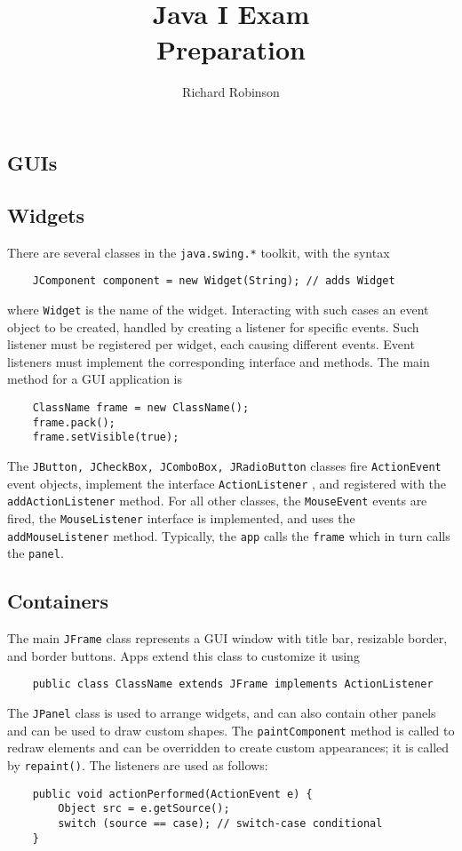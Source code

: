\documentclass[letterpaper, openany, justified]{tufte-book}
\title{\\Java I Exam \\Preparation}
\author{Richard Robinson}
\newcommand{\cd}[1]{\lstinline{#1}}
\begin{document}
\maketitle
\tableofcontents
\setlength{\parindent}{0pt}
\begin{fullwidth}

\chapter{GUIs}

\section{Widgets}
There are several classes in the \lstinline{java.swing.*} toolkit, with the syntax \begin{lstlisting}
    JComponent component = new Widget(String); // adds Widget
\end{lstlisting}
where \lstinline{Widget} is the name of the widget. Interacting with such cases an event object to be created, handled by creating a listener for specific events. Such listener must be registered per widget, each causing different events. Event listeners must implement the corresponding interface and methods. The main method for a GUI application is
\begin{lstlisting}
    ClassName frame = new ClassName();
    frame.pack();
    frame.setVisible(true);
\end{lstlisting}
The \lstinline{JButton, JCheckBox, JComboBox, JRadioButton} classes fire \lstinline{ActionEvent} event objects, implement the interface \lstinline{ActionListener} , and registered with the \lstinline{addActionListener} method. For all other classes, the \lstinline{MouseEvent} events are fired, the \lstinline{MouseListener} interface is implemented, and uses the \lstinline{addMouseListener} method. Typically, the \lstinline{app} calls the \cd{frame} which in turn calls the \cd{panel}.

\section{Containers}
The main \lstinline{JFrame} class represents a GUI window with title bar, resizable border, and border buttons. Apps extend this class to customize  it using \begin{lstlisting}
    public class ClassName extends JFrame implements ActionListener
\end{lstlisting}
The \cd{JPanel} class is used to arrange widgets, and can also contain other panels and can be used to draw custom shapes. The \cd{paintComponent} method is called to redraw elements and can be overridden to create custom appearances; it is called by \cd{repaint()}. The listeners are used as follows:
\begin{lstlisting}
    public void actionPerformed(ActionEvent e) {
        Object src = e.getSource();
        switch (source == case); // switch-case conditional
    }
\end{lstlisting}


\end{fullwidth}
\end{document}
